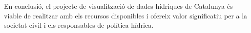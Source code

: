 En conclusió, el projecte de visualització de dades hídriques de Catalunya és viable de realitzar amb els recursos disponibles i ofereix valor significatiu per a la societat civil i els responsables de política hídrica.

